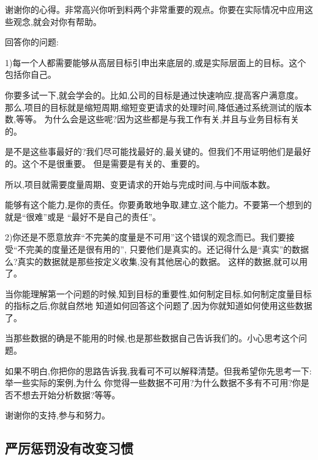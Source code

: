 \documentclass[11pt]{article}
\begin{document}
\begin{yang}
\ylogo 谢谢你的心得。非常高兴你听到料两个非常重要的观点。你要在实际情况中应用这些观念,就会对你有帮助。

回答你的问题:

1)每一个人都需要能够从高层目标引申出来底层的,或是实际层面上的目标。这个包括你自己。

   你要多试一下,就会学会的。比如,公司的目标是通过快速响应,提高客户满意度。
   那么,项目的目标就是缩短周期,缩短变更请求的处理时间,降低通过系统测试的版本数,等等。
   为什么会是这些呢?因为这些都是与我工作有关,并且与业务目标有关的。

   是不是这些事最好的?我们尽可能找最好的,最关键的。但我们不用证明他们是最好的。这个不是很重要。
   但是需要是有关的、重要的。

   所以,项目就需要度量周期、变更请求的开始与完成时间,与中间版本数。

   能够有这个能力,是你的责任。你要勇敢地争取,建立,这个能力。不要第一个想到的就是``很难''或是
   ``最好不是自己的责任''。

2)你还是不愿意放弃``不完美的度量是不可用''这个错误的观念而已。我们要接受``不完美的度量还是很有用的'',
   只要他们是真实的。还记得什么是``真实''的数据么?真实的数据就是那些按定义收集,没有其他居心的数据。
   这样的数据,就可以用了。

   当你能理解第一个问题的时候,知到目标的重要性,如何制定目标,如何制定度量目标的指标之后,你就自然地
   知道如何回答这个问题了,因为你就知道如何使用这些数据了。

   当那些数据的确是不能用的时候,也是那些数据自己告诉我们的。小心思考这个问题。

如果不明白,你把你的思路告诉我,我看可不可以解释清楚。但我希望你先思考一下:举一些实际的案例,为什么
你觉得一些数据不可用?为什么数据不多有不可用?你是否不想去开始分析数据?等等。

谢谢你的支持,参与和努力。
\end{yang}

\subsection{严厉惩罚没有改变习惯}
\end{document}
